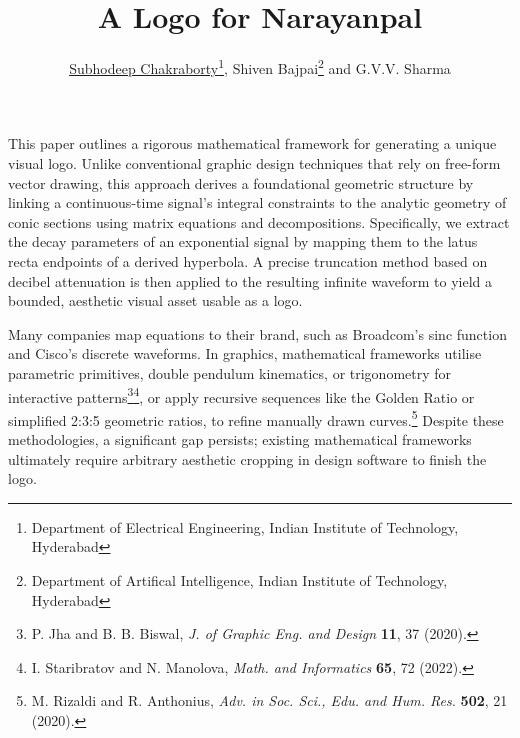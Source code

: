 \documentclass{article}
\date{}
\title{\bfseries\large{A Logo for Narayanpal}}
\author{\underline{Subhodeep Chakraborty}\footnote{Department of Electrical Engineering, Indian Institute of Technology, Hyderabad}, Shiven Bajpai\footnote{Department of Artifical Intelligence, Indian Institute of Technology, Hyderabad} and G.V.V. Sharma\footnotemark[1]}
\numberwithin{equation}{section}
\numberwithin{figure}{section}
\begin{document}
\maketitle

This paper outlines a rigorous mathematical framework for generating a unique visual logo. Unlike conventional graphic design techniques that rely on free-form vector drawing, this approach derives a foundational geometric structure by linking a continuous-time signal's integral constraints to the analytic geometry of conic sections using matrix equations and decompositions. Specifically, we extract the decay parameters of an exponential signal by mapping them to the latus recta endpoints of a derived hyperbola. A precise truncation method based on decibel attenuation is then applied to the resulting infinite waveform to yield a bounded, aesthetic visual asset usable as a logo.

Many companies map equations to their brand, such as Broadcom's sinc function and Cisco's discrete waveforms.  In graphics, mathematical frameworks utilise parametric primitives, double pendulum kinematics, or trigonometry for interactive patterns\footnote{P. Jha and B. B. Biswal, \emph{J. of Graphic Eng. and Design} \textbf{11}, 37 (2020).}\footnote{I. Staribratov and N. Manolova, \emph{Math. and Informatics} \textbf{65}, 72 (2022).}, or apply recursive sequences like the Golden Ratio or simplified 2:3:5 geometric ratios, to refine manually drawn curves.\footnote{M. Rizaldi and R. Anthonius, \emph{Adv. in Soc. Sci., Edu. and Hum. Res.} \textbf{502}, 21 (2020).} 
Despite these methodologies, a significant gap persists; existing mathematical frameworks ultimately require arbitrary aesthetic cropping in design software to finish the logo. 
\end{document}
